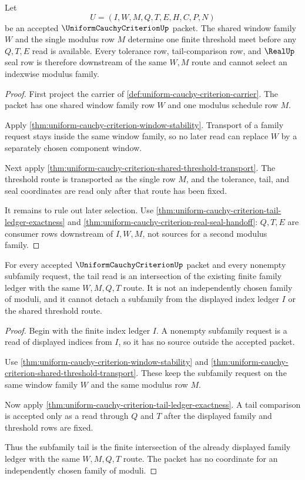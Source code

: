 \begin{theorem}
\label{thm:uniform-cauchy-criterion-shared-window-threshold-meet}
Let
$$
U=(I,W,M,Q,T,E,H,C,P,N)
$$
be an accepted $\UniformCauchyCriterionUp$ packet. The shared window family $W$ and the single modulus row $M$ determine one finite threshold meet before any $Q,T,E$ read is available. Every tolerance row, tail-comparison row, and $\RealUp$ seal row is therefore downstream of the same $W,M$ route and cannot select an indexwise modulus family.
\end{theorem}
\begin{proof}
First project the carrier of \autoref{def:uniform-cauchy-criterion-carrier}. The packet has one shared window family row $W$ and one modulus schedule row $M$.

Apply \autoref{thm:uniform-cauchy-criterion-window-stability}. Transport of a family request stays inside the same window family, so no later read can replace $W$ by a separately chosen component window.

Next apply \autoref{thm:uniform-cauchy-criterion-shared-threshold-transport}. The threshold route is transported as the single row $M$, and the tolerance, tail, and seal coordinates are read only after that route has been fixed.

It remains to rule out later selection. Use \autoref{thm:uniform-cauchy-criterion-tail-ledger-exactness} and \autoref{thm:uniform-cauchy-criterion-real-seal-handoff}: $Q,T,E$ are consumer rows downstream of $I,W,M$, not sources for a second modulus family.
\end{proof}
\begin{theorem}
\label{thm:uniform-cauchy-criterion-family-tail-intersection}
For every accepted $\UniformCauchyCriterionUp$ packet and every nonempty subfamily request, the tail read is an intersection of the existing finite family ledger with the same $W,M,Q,T$ route. It is not an independently chosen family of moduli, and it cannot detach a subfamily from the displayed index ledger $I$ or the shared threshold route.
\end{theorem}
\begin{proof}
Begin with the finite index ledger $I$. A nonempty subfamily request is a read of displayed indices from $I$, so it has no source outside the accepted packet.

Use \autoref{thm:uniform-cauchy-criterion-window-stability} and \autoref{thm:uniform-cauchy-criterion-shared-threshold-transport}. These keep the subfamily request on the same window family $W$ and the same modulus row $M$.

Now apply \autoref{thm:uniform-cauchy-criterion-tail-ledger-exactness}. A tail comparison is accepted only as a read through $Q$ and $T$ after the displayed family and threshold rows are fixed.

Thus the subfamily tail is the finite intersection of the already displayed family ledger with the same $W,M,Q,T$ route. The packet has no coordinate for an independently chosen family of moduli.
\end{proof}
